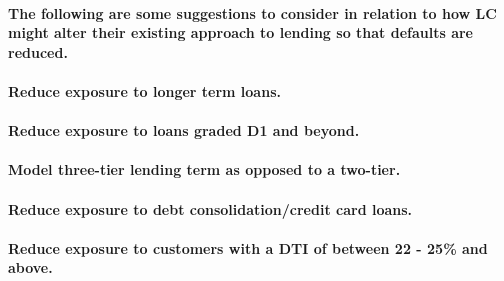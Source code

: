 \documentclass[
]{article}
\begin{document}
\hypertarget{the-following-are-some-suggestions-to-consider-in-relation-to-how-lc-might-alter-their-existing-approach-to-lending-so-that-defaults-are-reduced.}{%
\paragraph{The following are some suggestions to consider in relation to
how LC might alter their existing approach to lending so that defaults
are
reduced.}\label{the-following-are-some-suggestions-to-consider-in-relation-to-how-lc-might-alter-their-existing-approach-to-lending-so-that-defaults-are-reduced.}}

\hypertarget{reduce-exposure-to-longer-term-loans.}{%
\paragraph{Reduce exposure to longer term
loans.}\label{reduce-exposure-to-longer-term-loans.}}

\hypertarget{reduce-exposure-to-loans-graded-d1-and-beyond.}{%
\paragraph{Reduce exposure to loans graded D1 and
beyond.}\label{reduce-exposure-to-loans-graded-d1-and-beyond.}}

\hypertarget{model-three-tier-lending-term-as-opposed-to-a-two-tier.}{%
\paragraph{Model three-tier lending term as opposed to a
two-tier.}\label{model-three-tier-lending-term-as-opposed-to-a-two-tier.}}

\hypertarget{reduce-exposure-to-debt-consolidationcredit-card-loans.}{%
\paragraph{Reduce exposure to debt consolidation/credit card
loans.}\label{reduce-exposure-to-debt-consolidationcredit-card-loans.}}

\hypertarget{reduce-exposure-to-customers-with-a-dti-of-between-22---25-and-above.}{%
\paragraph{Reduce exposure to customers with a DTI of between 22 - 25\%
and
above.}\label{reduce-exposure-to-customers-with-a-dti-of-between-22---25-and-above.}}
\end{document}

